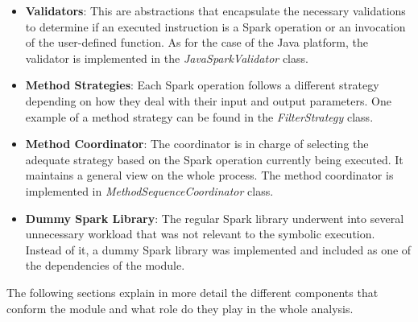 \begin{itemize}
	\item \textbf{Validators}: This are abstractions that encapsulate the necessary validations to determine if an executed instruction is a Spark operation or an invocation of the user-defined function. As for the case of the Java platform, the validator is implemented in the \textit{JavaSparkValidator} class.
	\item \textbf{Method Strategies}: Each Spark operation follows a different strategy depending on how they deal with their input and output parameters. One example of a method strategy can be found in the \textit{FilterStrategy} class.
	\item \textbf{Method Coordinator}: The coordinator is in charge of selecting the adequate strategy based on the Spark operation currently being executed. It maintains a general view on the whole process. The method coordinator is implemented in \textit{MethodSequenceCoordinator} class.
	\item \textbf{Dummy Spark Library}: The regular Spark library underwent into several unnecessary workload that was not relevant to the symbolic execution. Instead of it, a dummy Spark library was implemented and included as one of the dependencies of the module.
\end{itemize}

The following sections explain in more detail the different components that conform the module and what role do they play in the whole analysis.





